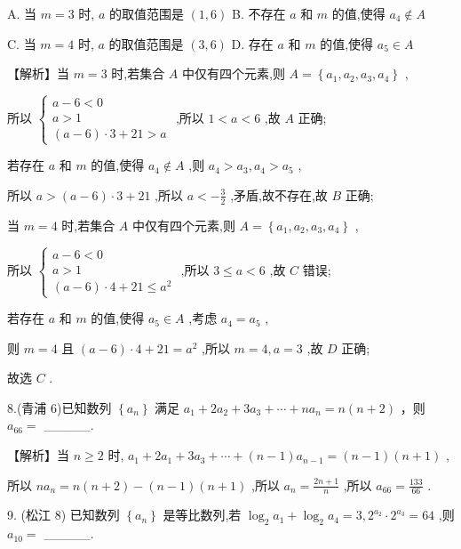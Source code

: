 \documentclass[10pt]{article}
\begin{document}
A. 当 \(m = 3\) 时, \(a\) 的取值范围是 \(\left( {1,6}\right)\) B. 不存在 \(a\) 和 \(m\) 的值,使得 \({a}_{4} \notin  A\)

C. 当 \(m = 4\) 时, \(a\) 的取值范围是 \(\left( {3,6}\right)\) D. 存在 \(a\) 和 \(m\) 的值,使得 \({a}_{5} \in  A\)

【解析】当 \(m = 3\) 时,若集合 \(A\) 中仅有四个元素,则 \(A = \left\{  {{a}_{1},{a}_{2},{a}_{3},{a}_{4}}\right\}\) ,

所以 \(\left\{  \begin{array}{l} a - 6 < 0 \\  a > 1 \\  \left( {a - 6}\right)  \cdot  3 + {21} > a \end{array}\right.\) ,所以 \(1 < a < 6\) ,故 \(A\) 正确;

若存在 \(a\) 和 \(m\) 的值,使得 \({a}_{4} \notin  A\) ,则 \({a}_{4} > {a}_{3},{a}_{4} > {a}_{5}\) ,

所以 \(a > \left( {a - 6}\right)  \cdot  3 + {21}\) ,所以 \(a <  - \frac{3}{2}\) ,矛盾,故不存在,故 \(B\) 正确;

当 \(m = 4\) 时,若集合 \(A\) 中仅有四个元素,则 \(A = \left\{  {{a}_{1},{a}_{2},{a}_{3},{a}_{4}}\right\}\) ,

所以 \(\left\{  \begin{array}{l} a - 6 < 0 \\  a > 1 \\  \left( {a - 6}\right)  \cdot  4 + {21} \leq  {a}^{2} \end{array}\right.\) ,所以 \(3 \leq  a < 6\) ,故 \(C\) 错误;

若存在 \(a\) 和 \(m\) 的值,使得 \({a}_{5} \in  A\) ,考虑 \({a}_{4} = {a}_{5}\) ,

则 \(m = 4\) 且 \(\left( {a - 6}\right)  \cdot  4 + {21} = {a}^{2}\) ,所以 \(m = 4,a = 3\) ,故 \(D\) 正确;

故选 \(C\) .

8.(青浦 6)已知数列 \(\left\{  {a}_{n}\right\}\) 满足 \({a}_{1} + 2{a}_{2} + 3{a}_{3} + \cdots  + n{a}_{n} = n\left( {n + 2}\right)\) ，则 \({a}_{66} =\) \_\_\_\_\_.

【解析】当 \(n \geq  2\) 时, \({a}_{1} + 2{a}_{1} + 3{a}_{3} + \cdots  + \left( {n - 1}\right) {a}_{n - 1} = \left( {n - 1}\right) \left( {n + 1}\right)\) ,

所以 \(n{a}_{n} = n\left( {n + 2}\right)  - \left( {n - 1}\right) \left( {n + 1}\right)\) ,所以 \({a}_{n} = \frac{{2n} + 1}{n}\) ,所以 \({a}_{66} = \frac{133}{66}\) .

9. (松江 8) 已知数列 \(\left\{  {a}_{n}\right\}\) 是等比数列,若 \({\log }_{2}{a}_{1} + {\log }_{2}{a}_{4} = 3,{2}^{{a}_{2}} \cdot  {2}^{{a}_{3}} = {64}\) ,则 \({a}_{10} =\) \_\_\_\_\_.
\end{document}
